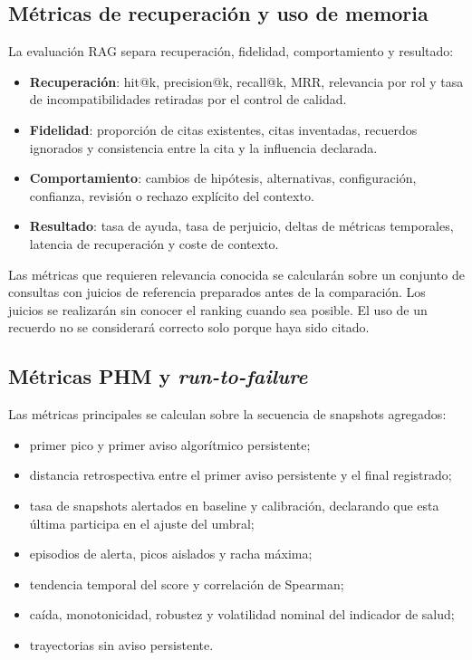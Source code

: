 \subsection{Métricas de recuperación y uso de memoria}

La evaluación RAG separa recuperación, fidelidad, comportamiento y resultado:

\begin{itemize}
  \item \textbf{Recuperación}: hit@k, precision@k, recall@k, MRR, relevancia por
        rol y tasa de incompatibilidades retiradas por el control de calidad.
  \item \textbf{Fidelidad}: proporción de citas existentes, citas inventadas,
        recuerdos ignorados y consistencia entre la cita y la influencia
        declarada.
  \item \textbf{Comportamiento}: cambios de hipótesis, alternativas,
        configuración, confianza, revisión o rechazo explícito del contexto.
  \item \textbf{Resultado}: tasa de ayuda, tasa de perjuicio, deltas de métricas
        temporales, latencia de recuperación y coste de contexto.
\end{itemize}

Las métricas que requieren relevancia conocida se calcularán sobre un conjunto
de consultas con juicios de referencia preparados antes de la comparación. Los
juicios se realizarán sin conocer el ranking cuando sea posible. El uso de un
recuerdo no se considerará correcto solo porque haya sido citado.

\subsection{Métricas PHM y \textit{run-to-failure}}

Las métricas principales se calculan sobre la secuencia de snapshots agregados:

\begin{itemize}
  \item primer pico y primer aviso algorítmico persistente;
  \item distancia retrospectiva entre el primer aviso persistente y el final
        registrado;
  \item tasa de snapshots alertados en baseline y calibración, declarando que
        esta última participa en el ajuste del umbral;
  \item episodios de alerta, picos aislados y racha máxima;
  \item tendencia temporal del score y correlación de Spearman;
  \item caída, monotonicidad, robustez y volatilidad nominal del indicador de
        salud;
  \item trayectorias sin aviso persistente.
\end{itemize}

